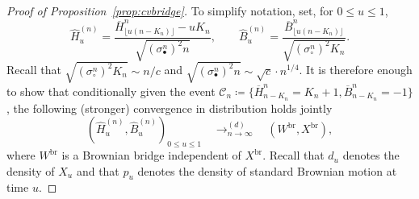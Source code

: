 \documentclass[10pt]{amsart}
\theoremstyle{definition}\newtheorem{defi}[theo]{Definition}\newtheorem{rema}[theo]{Remark}\newtheorem{exam}[theo]{Example}\newtheorem{exem}[theo]{Example}\newtheorem{nota}[theo]{Notation}
\def\scn{\sigma_{\circ}^{n}}
\def\sbn{\sigma_{\bullet}^{n}}
\def\oB{\overline{B}}
\def\hB{\widehat{B}}
\def\oH{\overline{H}}
\def\hH{\widehat{H}}
\def \Xbr{X^{\mathrm{br}}}
\begin{document}
\begin{proof}[Proof of Proposition~\ref{prop:cvbridge}] To simplify notation, set, for $0 \leq u \leq 1$,
\[\hH^{(n)}_{u}= \frac{\oH^{n}_{ \lfloor u (n-K_{n}) \rfloor } - u K_{n} }{\sqrt{ (\sbn)^{2} n} }, \qquad \hB^{(n)}_{u}= \frac{\oB^{n}_{\lfloor u (n-K_{n}) \rfloor}}{ \sqrt{ (\scn)^{2} K_{n} }} .\]
Recall that $\sqrt{ (\scn)^{2} K_{n}} \sim {n}/{c}$ and $\sqrt{ (\sbn)^{2} n} \sim \sqrt{c}\cdot n^{1/4}$.
It is therefore enough to show that conditionally given the event
$ \mathcal{C}_{n} \coloneqq \{\oH^{n}_{n-K_{n}}=K_{n}+1, \oB^{n}_{n-K_{n}}=-1 \}$,
the following (stronger) convergence in distribution holds jointly
\[  \left(  \hH^{(n)}_{u},  \hB^{(n)}_{u} \right)_{0 \leq u \leq 1}  \quad \mathop{\longrightarrow}^{(d)}_{n \rightarrow \infty} \quad (W^{\mathrm{br}},\Xbr),\]
where $ W^{\mathrm{br}}$ is a Brownian bridge independent of $\Xbr$.  Recall that $d_{u}$ denotes the density of $X_{u}$ and that $p_{u}$ denotes the density of standard Brownian motion at time $u$.





\end{proof}
\end{document}
